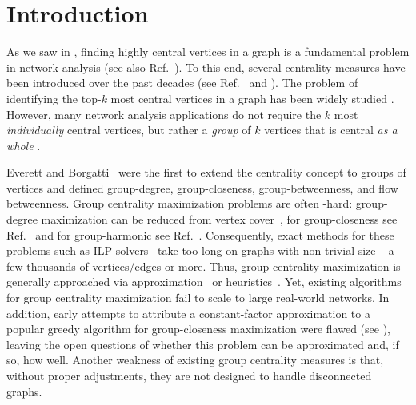 \chapter*{Introduction}
%
As we saw in ,
finding highly central vertices in a graph is a fundamental
problem in network analysis (see also Ref.~\cite{newman2018networks}).
To this end, several
centrality measures have been introduced over the past decades (see
Ref.~\cite{DBLP:journals/im/BoldiV14} and ).
The problem of identifying the top-$k$ most central vertices in
a graph has been widely studied
\cite{DBLP:journals/tkdd/BergaminiBCMM19,
DBLP:conf/faw/OkamotoCL08,DBLP:conf/icde/OlsenLH14,DBLP:conf/www/LeeC14}.
However, many network analysis applications do not require the $k$
most \emph{individually} central vertices, but rather a \emph{group}
of $k$ vertices that is central \emph{as a whole}
\cite{DBLP:journals/toc/KempeKT15,
DBLP:journals/isci/ZhaoWLTG17,DBLP:journals/pe/GkantsidisMS06,DBLP:conf/icde/LiLCCDZ15,
yan2006efficient}.

Everett and Borgatti~\cite{everett1999centrality}
were the first to extend the centrality concept to groups of vertices and
defined group-degree, group-closeness, group-betweenness, and flow betweenness.
Group centrality maximization problems are often \np-hard: group-degree
maximization can be reduced from vertex cover~\cite{DBLP:conf/alenex/AngrimanGBZGM20},
for group-closeness see Ref.~\cite{DBLP:conf/adc/ChenWW16} and for group-harmonic
see Ref.~\cite{DBLP:conf/alenex/AngrimanBDGGM21}.
Consequently, exact methods for these problems such as ILP
solvers~\cite{DBLP:conf/alenex/BergaminiGM18} take too long on graphs with
non-trivial size -- a few thousands of vertices/edges or more.
Thus, group centrality maximization is generally approached via
approximation~\cite{DBLP:conf/kdd/MahmoodyTU16,DBLP:conf/www/0002PSYZ19}
or heuristics~\cite{DBLP:conf/alenex/BergaminiGM18,DBLP:conf/adc/ChenWW16}.
Yet, existing algorithms for group centrality maximization fail to scale to
large real-world networks. In addition, early attempts to attribute a constant-factor
approximation to a popular greedy algorithm for group-closeness maximization
were flawed (see ), leaving the open
questions of whether this problem can be approximated and, if so, how well.
Another weakness of existing group centrality measures is that, without proper
adjustments, they are not designed to handle disconnected graphs.

